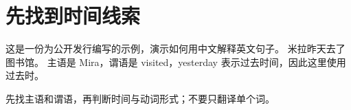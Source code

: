 \section{先找到时间线索}
这是一份为公开发行编写的示例，演示如何用中文解释英文句子。
{米拉昨天去了图书馆。}
主语是 Mira，谓语是 visited，yesterday 表示过去时间，因此这里使用过去时。
\begin{mynote}
先找主语和谓语，再判断时间与动词形式；不要只翻译单个词。
\end{mynote}
